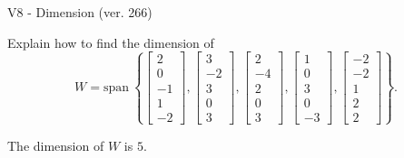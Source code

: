 \begin{exercise}
  \begin{exerciseTitle}V8 - Dimension (ver. 266)\end{exerciseTitle}
  \begin{exerciseStatement}
    Explain how to find the dimension of 
\[W=\mathrm{span}\ \left\{\left[\begin{array}{r}
2 \\
0 \\
-1 \\
1 \\
-2
\end{array}\right] , \left[\begin{array}{r}
3 \\
-2 \\
3 \\
0 \\
3
\end{array}\right] , \left[\begin{array}{r}
2 \\
-4 \\
2 \\
0 \\
3
\end{array}\right] , \left[\begin{array}{r}
1 \\
0 \\
3 \\
0 \\
-3
\end{array}\right] , \left[\begin{array}{r}
-2 \\
-2 \\
1 \\
2 \\
2
\end{array}\right]\right\}.\]



  \end{exerciseStatement}
  \begin{exerciseAnswer}
   The dimension of \(W\) is  \(5\).
  


  \end{exerciseAnswer}
\end{exercise}